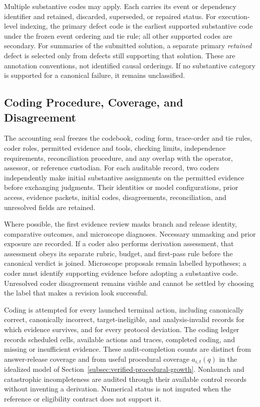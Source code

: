 \documentclass[10pt]{article} %
\providecommand{\1}{\mathbf{1}}  %
\theoremstyle{remark}
\theoremstyle{definition}
\begin{document}
Multiple substantive codes may apply. Each carries its event or
dependency identifier and retained, discarded, superseded, or
repaired status. For execution-level indexing, the primary defect
code is the earliest supported substantive code under the frozen
event ordering and tie rule; all other supported codes are secondary.
For summaries of the submitted solution, a separate primary
\emph{retained} defect is selected only from defects still supporting
that solution. These are annotation conventions, not identified
causal orderings. If no substantive category is supported for a
canonical failure, it remains unclassified.

\subsection{Coding Procedure, Coverage, and Disagreement}
\label{subsec:audit-coding-procedure}

The accounting seal freezes the codebook, coding form, trace-order
and tie rules, coder roles, permitted evidence and tools, checking
limits, independence requirements, reconciliation procedure, and
any overlap with the operator, assessor, or reference custodian.
For each auditable record, two coders independently make initial
substantive assignments on the permitted evidence before exchanging
judgments. Their identities or model configurations, prior access,
evidence packets, initial codes, disagreements, reconciliation,
and unresolved fields are retained.

Where possible, the first evidence review masks branch and release
identity, comparative outcomes, and microscope diagnoses. Necessary
unmasking and prior exposure are recorded. If a coder also performs
derivation assessment, that assessment obeys its separate rubric,
budget, and first-pass rule before the canonical verdict is joined.
Microscope proposals remain labelled hypotheses; a coder must
identify supporting evidence before adopting a substantive code.
Unresolved coder disagreement remains visible and cannot be settled
by choosing the label that makes a revision look successful.

Coding is attempted for every launched terminal action, including
canonically correct, canonically incorrect, target-ineligible, and
analysis-invalid records for which evidence survives, and for every
protocol deviation. The coding ledger records scheduled
cells, available actions and traces, completed coding, and missing
or insufficient evidence. These audit-completion counts are distinct
from answer-release coverage and from useful procedural coverage
$a_{i,t}(q)$ in the idealized model of
Section~\ref{subsec:verified-procedural-growth}.
Nonlaunch and catastrophic incompleteness
are audited through their available control records without
inventing a derivation. Numerical status is not imputed when the
reference or eligibility contract does not support it.
\end{document}
